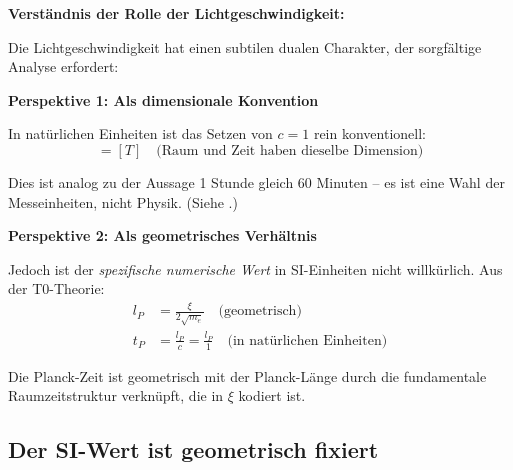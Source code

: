 	\begin{derivation}
		\textbf{Verständnis der Rolle der Lichtgeschwindigkeit:}
		
		Die Lichtgeschwindigkeit hat einen subtilen dualen Charakter, der sorgfältige Analyse erfordert:
		
		\textbf{Perspektive 1: Als dimensionale Konvention}
		
		In natürlichen Einheiten ist das Setzen von $c = 1$ rein konventionell:
		\begin{equation}
			[L] = [T] \quad \text{(Raum und Zeit haben dieselbe Dimension)}
		\end{equation}
		
		Dies ist analog zu der Aussage 1 Stunde gleich 60 Minuten -- es ist eine Wahl der Messeinheiten, nicht Physik. (Siehe \cite{Einheitenkonventionen_c_Geschwindigkeit_De}.)
		
		\textbf{Perspektive 2: Als geometrisches Verhältnis}
		
		Jedoch ist der \emph{spezifische numerische Wert} in SI-Einheiten nicht willkürlich. Aus der T0-Theorie:
		\begin{align}
			l_P &= \frac{\xi}{2\sqrt{m_e}} \quad \text{(geometrisch)} \\
			t_P &= \frac{l_P}{c} = \frac{l_P}{1} \quad \text{(in natürlichen Einheiten)}
		\end{align}
		
		Die Planck-Zeit ist geometrisch mit der Planck-Länge durch die fundamentale Raumzeitstruktur verknüpft, die in $\xi$ kodiert ist.
	\end{derivation}
	
	\subsection{Der SI-Wert ist geometrisch fixiert}
	
